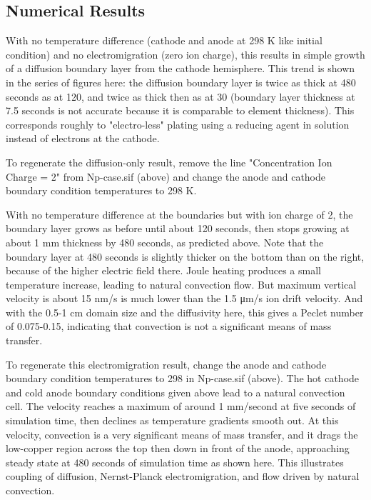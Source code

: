 \subsection{Numerical Results}

With no temperature difference (cathode and anode at 298 K like initial condition) and no electromigration (zero ion charge), this results in simple growth of a diffusion boundary layer from the cathode hemisphere. This trend is shown in the series of figures here: the diffusion boundary layer is twice as thick at 480 seconds as at 120, and twice as thick then as at 30 (boundary layer thickness at 7.5 seconds is not accurate because it is comparable to element thickness). This corresponds roughly to "electro-less" plating using a reducing agent in solution instead of electrons at the cathode.

To regenerate the diffusion-only result, remove the line "Concentration Ion Charge = 2" from Np-case.sif (above) and change the anode and cathode boundary condition temperatures to 298 K.

With no temperature difference at the boundaries but with ion charge of 2, the boundary layer grows as before until about 120 seconds, then stops growing at about 1 mm thickness by 480 seconds, as predicted above. Note that the boundary layer at 480 seconds is slightly thicker on the bottom than on the right, because of the higher electric field there. Joule heating produces a small temperature increase, leading to natural convection flow. But maximum vertical velocity is about 15 nm/s is much lower than the 1.5 μm/s ion drift velocity. And with the 0.5-1 cm domain size and the diffusivity here, this gives a Peclet number of 0.075-0.15, indicating that convection is not a significant means of mass transfer.

To regenerate this electromigration result, change the anode and cathode boundary condition temperatures to 298 in Np-case.sif (above).  The hot cathode and cold anode boundary conditions given above lead to a natural convection cell. The velocity reaches a maximum of around 1 mm/second at five seconds of simulation time, then declines as temperature gradients smooth out. At this velocity, convection is a very significant means of mass transfer, and it drags the low-copper region across the top then down in front of the anode, approaching steady state at 480 seconds of simulation time as shown here. This illustrates coupling of diffusion, Nernst-Planck electromigration, and flow driven by natural convection.


